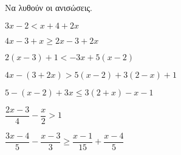 Να λυθούν οι ανισώσεις.
\begin{multicols}{2}
\begin{alist}
\item $ 3x-2<x+4+2x $
\item $ 4x-3+x\geq2x-3+2x $
\item $ 2(x-3)+1<-3x+5(x-2) $
\item $ 4x-(3+2x)>5(x-2)+3(2-x)+1 $
\item $ 5-(x-2)+3x\leq3(2+x)-x-1 $
\item $ \dfrac{2x-3}{4}-\dfrac{x}{2}>1 $
\item $ \dfrac{3x-4}{5}-\dfrac{x-3}{3}\geq\dfrac{x-1}{15}+\dfrac{x-4}{5} $
\end{alist}
\end{multicols}
